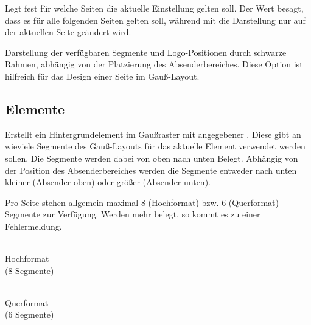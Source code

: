 Legt fest für welche Seiten die aktuelle Einstellung gelten soll.
Der Wert  besagt, dass es für alle folgenden Seiten gelten soll,
während mit  die Darstellung nur auf der aktuellen Seite geändert 
wird.

\begin{Declaration}
\end{Declaration}

Darstellung der verfügbaren Segmente und Logo-Positionen durch schwarze Rahmen, abhängig von der Platzierung des Absenderbereiches.
Diese Option ist hilfreich für das Design einer Seite im Gauß-Layout.


\subsection{Elemente}\label{subsec:gausspage:bgelement}

\begin{Declaration}
\end{Declaration}

Erstellt ein Hintergrundelement im Gaußraster mit angegebener .
Diese gibt an wieviele Segmente des Gauß-Layouts für das aktuelle Element
verwendet werden sollen.
Die Segmente werden dabei von oben nach unten Belegt.
Abhängig von der Position des Absenderbereiches werden die Segmente
entweder nach unten kleiner (Absender oben) oder größer (Absender unten).

\noindent\begin{minipage}{0.4\textwidth}
Pro Seite stehen allgemein maximal 8 (Hochformat) bzw. 6 (Querformat)
Segmente zur Verfügung. Werden mehr belegt, so kommt es zu einer Fehlermeldung.
\end{minipage}
\begin{minipage}{0.6\textwidth}\centering
\begin{minipage}[b]{0.4\textwidth}\centering
{}\\
Hochformat\\ (8 Segmente)
\end{minipage}
\begin{minipage}[b]{0.45\textwidth}\centering
{}\\
Querformat\\ (6 Segmente)
\end{minipage}
\end{minipage}
\vspace*{0pt}


